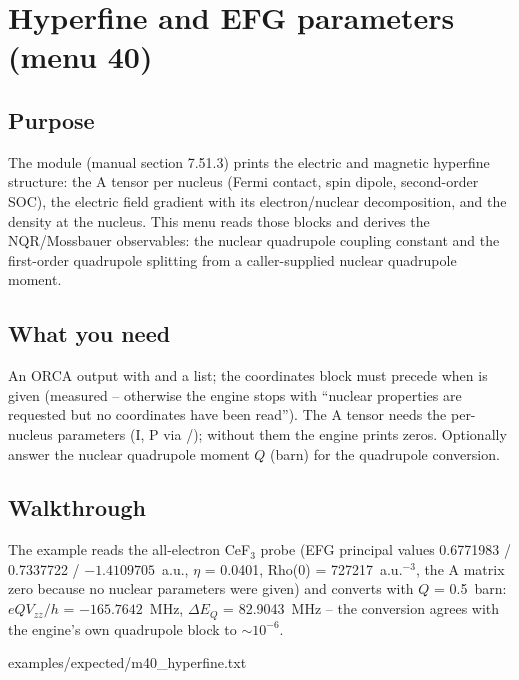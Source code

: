\chapter{Hyperfine and EFG parameters (menu 40)}
\label{ch:menu40}

\section{Purpose}

The  module (manual section 7.51.3) prints the electric and
magnetic hyperfine structure: the A tensor per nucleus (Fermi contact,
spin dipole, second-order SOC), the electric field gradient with its
electron/nuclear decomposition, and the density at the nucleus.  This menu
reads those blocks and derives the NQR/Mossbauer observables: the nuclear
quadrupole coupling constant and the first-order quadrupole splitting from
a caller-supplied nuclear quadrupole moment.

\section{What you need}

An ORCA output with  and a  list; the
coordinates block must precede  when  is given
(measured -- otherwise the engine stops with ``nuclear properties are
requested but no coordinates have been read'').  The A tensor needs the
per-nucleus parameters (I, P via /); without them the
engine prints zeros.  Optionally answer the nuclear quadrupole moment
$Q$ (barn) for the quadrupole conversion.

\section{Walkthrough}

The example reads the all-electron CeF$_3$ probe (EFG principal values
0.6771983 / 0.7337722 / $-1.4109705$~a.u., $\eta$ = 0.0401,
Rho(0) = 727217~a.u.$^{-3}$, the A matrix zero because no nuclear
parameters were given) and converts with $Q$ = 0.5~barn:
$eQV_{zz}/h$ = $-165.7642$~MHz, $\Delta E_Q$ = 82.9043~MHz -- the
conversion agrees with the engine's own quadrupole block to $\sim10^{-6}$.


  {examples/expected/m40_hyperfine.txt}

